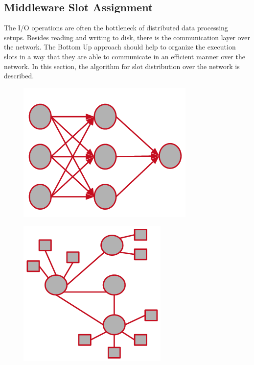 \subsection{Middleware Slot Assignment}
The I/O operations are often the bottleneck of distributed data processing setups\cite{cheating}. Besides
reading and writing to disk, there is the communication layer over the network. The Bottom Up
approach should help to organize the execution slots in a way that they are able to communicate in an
efficient manner over the network. In this section, the algorithm for  slot distribution over the
network is described.

\begin{figure}[h]
    \centering
    \begin{minipage}{0.5\textwidth}
        \centering
        \includegraphics[width=0.6\linewidth]{graphics/executiongraph.png}
        \label{fig:execution_graph}
    \end{minipage}%
    \begin{minipage}{0.5\textwidth}
        \centering
        \includegraphics[width=0.6\linewidth]{graphics/topology.png}
        \label{fig:network_topology}
    \end{minipage}
\end{figure}

